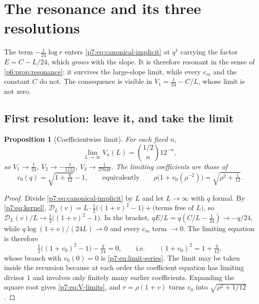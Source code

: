 \documentclass[11pt,a4paper,oneside]{book}
\theoremstyle{plain}
\newtheorem{proposition}[theorem]{Proposition}
\theoremstyle{definition}
\theoremstyle{remark}
\begin{document}
\section{The resonance and its three resolutions}
\label{p7:sec:resonance}

The term $-\tfrac1{24}\log r$ enters \eqref{p7:eq:canonical-implicit} at
$q^{1}$ carrying the factor $E=C-L/24$, which \emph{grows} with the slope.  It
is therefore resonant in the sense of \cref{p6:prop:resonance}: it survives
the large-slope limit, while every $c_m$ and the constant $C$ do not.  The
consequence is visible in $V_1=\tfrac1{24}-C/L$, whose limit is not zero.

\subsection{First resolution: leave it, and take the limit}

\begin{proposition}[Coefficientwise limit]\label{p7:prop:limit}
For each fixed $n$,
\begin{equation}\label{p7:eq:V-limits}
 \lim_{L\to\infty}V_n(L)=\binom{1/2}{n}12^{-n},
\end{equation}
so $V_1\to\tfrac1{24}$, $V_2\to-\tfrac1{1152}$, $V_3\to\tfrac1{27648}$.  The
limiting coefficients are those of
\begin{equation}\label{p7:eq:limit-series}
 v_0(q)=\sqrt{1+\tfrac q{12}}-1,
 \qquad\text{equivalently}\qquad
 \rho\bigl(1+v_0(\rho^{-2})\bigr)=\sqrt{\rho^{2}+\tfrac1{12}} .
\end{equation}
\end{proposition}

\begin{proof}
Divide \eqref{p7:eq:canonical-implicit} by $L$ and let $L\to\infty$ with $q$
formal.  By \eqref{p7:eq:kernel},
$\mathcal{D}_L(v)=L\cdot\tfrac12\bigl((1+v)^{2}-1\bigr)+\bigl(\text{terms free
of }L\bigr)$, so $\mathcal{D}_L(v)/L\to\tfrac12\bigl((1+v)^{2}-1\bigr)$.  In
the bracket, $qE/L=q(C/L-\tfrac1{24})\to-q/24$, while
$q\log(1+v)/(24L)\to0$ and every $c_m$ term $\to0$.  The limiting equation is
therefore
\[
 \tfrac12\bigl((1+v_0)^{2}-1\bigr)-\tfrac q{24}=0,
 \qquad\text{i.e.}\qquad (1+v_0)^{2}=1+\tfrac q{12},
\]
whose branch with $v_0(0)=0$ is \eqref{p7:eq:limit-series}.  The limit may be
taken inside the recursion because at each order the coefficient equation has
limiting divisor $1$ and involves only finitely many earlier coefficients.
Expanding the square root gives \eqref{p7:eq:V-limits}, and $r=\rho(1+v)$
turns $v_0$ into $\sqrt{\rho^{2}+1/12}$.
\end{proof}
\end{document}
